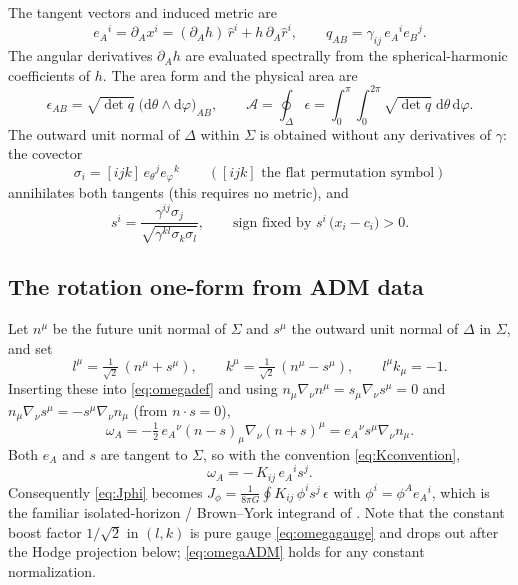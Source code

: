 \documentclass[11pt]{article}
\newcommand{\dd}{\mathrm{d}}
\begin{document}
The tangent vectors and induced metric are
\begin{equation}
  e_A{}^i = \partial_A x^i
          = (\partial_A h)\,\hat r^i + h\,\partial_A \hat r^i,
  \qquad
  q_{AB} = \gamma_{ij}\, e_A{}^i e_B{}^j .
  \label{eq:inducedmetric}
\end{equation}
The angular derivatives $\partial_A h$ are evaluated spectrally from the
spherical-harmonic coefficients of $h$.  The area form and the physical area
are
\begin{equation}
  \epsilon_{AB} = \sqrt{\det q}\;\bigl(\dd\theta\wedge\dd\varphi\bigr)_{AB},
  \qquad
  \mathcal{A} = \oint_\Delta \epsilon
             = \int_0^\pi\!\!\int_0^{2\pi} \sqrt{\det q}\;
               \dd\theta\,\dd\varphi .
  \label{eq:areaform}
\end{equation}
The outward unit normal of $\Delta$ within $\Sigma$ is obtained without any
derivatives of $\gamma$: the covector
\begin{equation}
  \sigma_i = [ijk]\, e_\theta{}^j e_\varphi{}^k
  \qquad (\text{$[ijk]$ the flat permutation symbol})
  \label{eq:normalcovector}
\end{equation}
annihilates both tangents (this requires no metric), and
\begin{equation}
  s^i = \frac{\gamma^{ij}\sigma_j}
             {\sqrt{\gamma^{kl}\sigma_k\sigma_l}},
  \qquad \text{sign fixed by } s^i\,\bigl(x_i - c_i\bigr) > 0 .
  \label{eq:unitnormal}
\end{equation}

\subsection{The rotation one-form from ADM data}
\label{sec:omega}

Let $n^\mu$ be the future unit normal of $\Sigma$ and $s^\mu$ the outward
unit normal of $\Delta$ in $\Sigma$, and set
\begin{equation}
  l^\mu = \tfrac{1}{\sqrt2}\,(n^\mu + s^\mu),
  \qquad
  k^\mu = \tfrac{1}{\sqrt2}\,(n^\mu - s^\mu),
  \qquad l^\mu k_\mu = -1 .
\end{equation}
Inserting these into \eqref{eq:omegadef} and using
$n_\mu \nabla_\nu n^\mu = s_\mu \nabla_\nu s^\mu = 0$ and
$n_\mu \nabla_\nu s^\mu = - s^\mu \nabla_\nu n_\mu$ (from $n\cdot s=0$),
\begin{equation}
  \omega_A
  = -\tfrac12\, e_A{}^\nu (n-s)_\mu \nabla_\nu (n+s)^\mu
  = e_A{}^\nu s^\mu \nabla_\nu n_\mu .
\end{equation}
Both $e_A$ and $s$ are tangent to $\Sigma$, so with the convention
\eqref{eq:Kconvention},
\begin{equation}
  \boxed{\;
  \omega_A = -\,K_{ij}\, e_A{}^i s^j .
  \;}
  \label{eq:omegaADM}
\end{equation}
Consequently \eqref{eq:Jphi} becomes
$J_\phi = \frac{1}{8\pi G}\oint K_{ij}\,\phi^i s^j\,\epsilon$ with
$\phi^i = \phi^A e_A{}^i$, which is the familiar isolated-horizon /
Brown--York integrand of \cite{dkss2003}.  Note that the constant boost
factor $1/\sqrt2$ in $(l,k)$ is pure gauge \eqref{eq:omegagauge} and drops
out after the Hodge projection below; \eqref{eq:omegaADM} holds for any
constant normalization.
\end{document}

